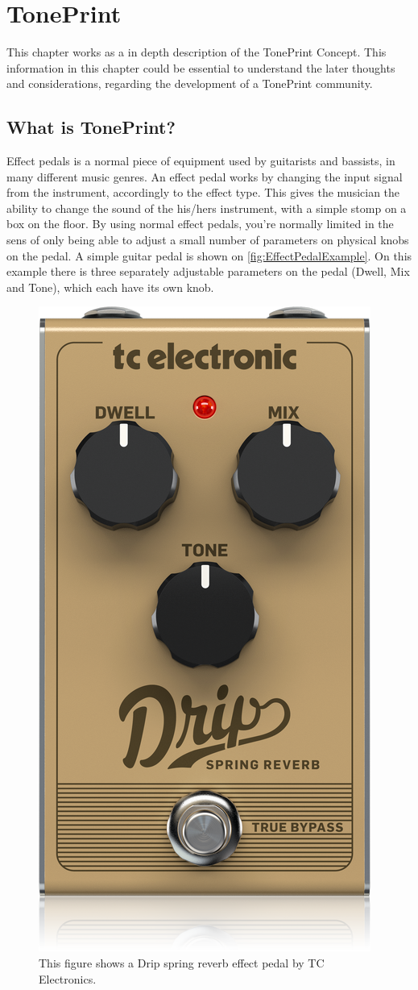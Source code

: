 \chapter{TonePrint}
\label{TonePrintConcept}

This chapter works as a in depth description of the TonePrint Concept. This information in this chapter could be essential to understand the later thoughts and considerations, regarding the development of a TonePrint community.

\section{What is TonePrint?}
\label{WhatIsTonePrint}

Effect pedals is a normal piece of equipment used by guitarists and bassists, in many different music genres. An effect pedal works by changing the input signal from the instrument, accordingly to the effect type. This gives the musician the ability to change the sound of the his/hers instrument, with a simple stomp on a box on the floor. By using normal effect pedals, you're normally limited in the sens of only being able to adjust a small number of parameters on physical knobs on the pedal. A simple guitar pedal is shown on \autoref{fig:EffectPedalExample}. On this example there is three separately adjustable parameters on the pedal (Dwell, Mix and Tone), which each have its own knob.

\begin{figure}
	\centering
	\includegraphics[width=.25\textwidth]{Graphics/EffectPedalExample}
	 \caption{This figure shows a Drip spring reverb effect pedal by TC Electronics.}
    \label{fig:EffectPedalExample}
\end{figure}

